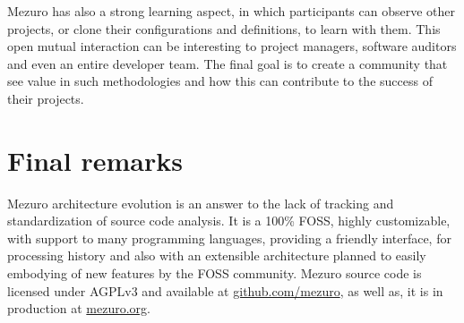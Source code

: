 \documentclass{llncs}
\begin{document}
Mezuro has also a strong learning aspect, in which participants can observe
other projects, or clone their configurations and definitions, to learn with
them.  This open mutual interaction can be interesting to project managers,
software auditors and even an entire developer team. The final goal is to
create a community that see value in such methodologies and how this can
contribute to the success of their projects.

\section{Final remarks}

Mezuro architecture evolution is an answer to the lack of tracking and
standardization of source code analysis. It is a 100\% FOSS, highly
customizable, with support to many programming languages, providing a friendly
interface, for processing history and also with an extensible architecture
planned to easily embodying of new features by the FOSS community. Mezuro
source code is licensed under AGPLv3 and available at \url{github.com/mezuro},
as well as, it is in production at \url{mezuro.org}.



\end{document}
